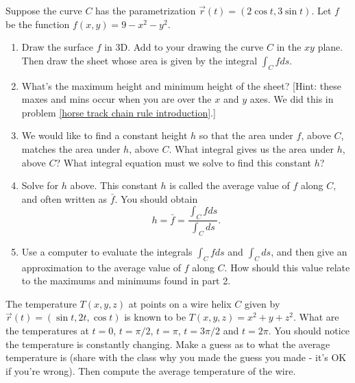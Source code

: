 \begin{problem}\label{Average Value intro}%
%
 Suppose the curve $C$ has the parametrization $\vec r(t) = (2\cos t, 3\sin t)$.  Let $f$ be the function $f(x,y)=9-x^2-y^2$.    \begin{enumerate}
  \item Draw the surface $f$ in 3D.  Add to your drawing the curve $C$ in the $xy$ plane. Then draw the sheet whose area is given by the integral $\int_C f ds$. 
  \item What's the maximum height and minimum height of the sheet? [Hint: these maxes and mins occur when you are over the $x$ and $y$ axes. We did this in problem \ref{horse track chain rule introduction}.]
  \item We would like to find a constant height $h$ so that the area under $f$, above $C$, matches the area under $h$, above $C$. What integral gives us the area under $h$, above $C$?  What integral equation must we solve to find this constant $h$?
  \item {}%
Solve for $h$ above. This constant $h$ is called the average value of $f$ along $C$, and often written as $\bar f$. You should obtain $$h=\bar f = \frac{\int_C f ds}{\int_C ds}.$$
  \item Use a computer to evaluate the integrals $\int_C f ds$ and $\int_C ds$, and then give an approximation to the average value of $f$ along $C$. How should this value relate to the maximums and minimums found in part 2.
 \end{enumerate}
\end{problem}

\begin{problem}%
 The temperature $T(x,y,z)$ at points on a wire helix $C$ given by $\vec r(t) = (\sin t, 2t, \cos t)$ is known to be $T(x,y,z)=x^2+y+z^2$. What are the temperatures at $t=0$, $t=\pi/2$, $t=\pi$, $t=3\pi/2$ and $t=2\pi$.  You should notice the temperature is constantly changing.  Make a guess as to what the average temperature is (share with the class why you made the guess you made - it's OK if you're wrong). Then compute the average temperature of the wire.
\end{problem}
